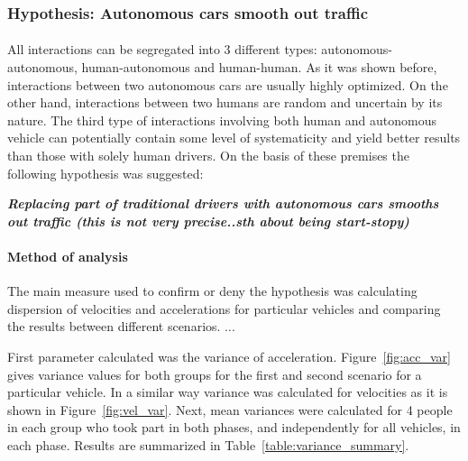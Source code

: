 \documentclass[11pt,english,twoside]{article}
\begin{document}
\subsubsection{Hypothesis: Autonomous cars smooth out traffic}
\paragraph{}
All interactions can be segregated into 3 different types: autonomous-autonomous, human-autonomous and human-human. As it was shown before, interactions between two autonomous cars are usually highly optimized. On the other hand, interactions between two humans are random and uncertain by its nature. The third type of interactions involving both human and autonomous vehicle can potentially contain some level of systematicity and yield better results than those with solely human drivers. On the basis of these premises the following hypothesis was suggested:

\textbf{\textit{Replacing part of traditional drivers with autonomous cars smooths out traffic (this is not very precise..sth about being start-stopy)}}

\paragraph{Method of analysis}
The main measure used to confirm or deny the hypothesis was calculating dispersion of velocities and accelerations for particular vehicles and comparing the results between different scenarios. ...\citep{dixon1957introduction}

First parameter calculated was the variance of acceleration. Figure~\ref{fig:acc_var} gives variance values for both groups for the first and second scenario for a particular vehicle. In a similar way variance was calculated for velocities as it is shown in Figure~\ref{fig:vel_var}. Next, mean variances were calculated for 4 people in each group who took part in both phases, and independently for all vehicles, in each phase. Results are summarized in Table~\ref{table:variance_summary}. 
 
\end{document}
